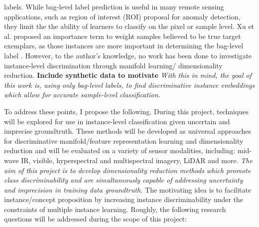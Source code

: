 labels. While bag-level label prediction is useful in many remote sensing applications, such as region of interest (ROI) proposal for anomaly detection, they limit the the ability of learners to classify on the pixel or sample level.  Xu et al. proposed an importance term to weight samples believed to be true target exemplars, as those instances are more important in determining the bag-level label \citep{Xu2011MI_Metric_Learning}.  However, to the author's knowledge, no work has been done to investigate instance-level discrimination through manifold learning/ dimensionality reduction.  \textbf{Include synthetic data to motivate }\textit{With this in mind, the goal of this work is, using only bag-level labels, to find discriminative instance embeddings which allow for accurate sample-level classification.}

To address these points, I propose the following.  During this project, techniques will be explored for use in instance-level classification given uncertain and imprecise groundtruth.  These methods will be developed as universal approaches for discriminative manifold/feature representation learning and dimensionality reduction and will be evaluated on a variety of sensor modalities, including: mid-wave IR, visible, hyperspectral and multispectral imagery, LiDAR and more.  \textit{The aim of this project is to develop dimensionality reduction methods which promote class discriminability and are simultaneously capable of addressing uncertainty and imprecision in training data groundtruth.}  The motivating idea is to facilitate instance/concept proposition by increasing instance discriminability under the constraints of multiple instance learning. Roughly, the following research questions will be addressed during the scope of this project:
